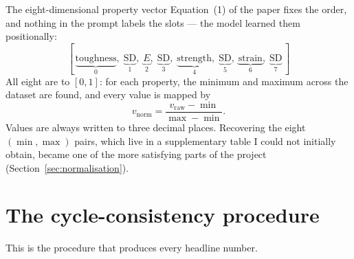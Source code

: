 \begin{keybox}{The eight-dimensional property vector}
Equation~(1) of the paper fixes the order, and nothing in the prompt labels the
slots --- the model learned them positionally:
\[
  [\,\underbrace{\text{toughness}}_{0},\;
    \underbrace{\text{SD}}_{1},\;
    \underbrace{E}_{2},\;
    \underbrace{\text{SD}}_{3},\;
    \underbrace{\text{strength}}_{4},\;
    \underbrace{\text{SD}}_{5},\;
    \underbrace{\text{strain}}_{6},\;
    \underbrace{\text{SD}}_{7}\,]
\]
All eight are  to $[0,1]$: for each property, the
minimum and maximum across the dataset are found, and every value is mapped by
\[
  v_{\text{norm}} = \frac{v_{\text{raw}} - \min}{\max - \min}.
\]
Values are always written to three decimal places. Recovering the eight
$(\min,\max)$ pairs, which live in a supplementary table I could not initially
obtain, became one of the more satisfying parts of the project
(Section~\ref{sec:normalisation}).
\end{keybox}

\section{The cycle-consistency procedure}
\label{sec:cycle}

This is the procedure that produces every headline number.

